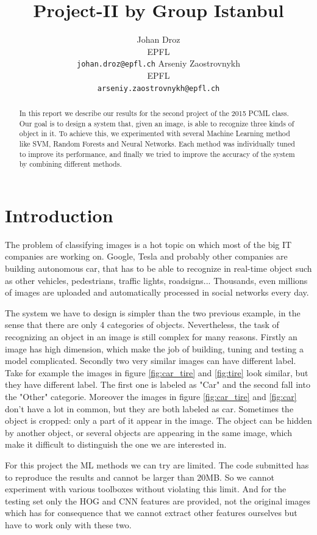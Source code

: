 \documentclass{article} %
\title{Project-II by Group Istanbul}
\author{
Johan Droz\\
EPFL \\
\texttt{johan.droz@epfl.ch} \And
Arseniy Zaostrovnykh\\
EPFL \\
\texttt{arseniy.zaostrovnykh@epfl.ch}
}
\begin{document}
\maketitle

\begin{abstract}
In this report we describe our results for the second project of the 2015 PCML class.
Our goal is to design a system that, given an image, is able to recognize three kinds of object in it.
To achieve this, we experimented with several Machine Learning method like SVM, Random Forests and Neural Networks. Each method was individually tuned to improve its performance, and finally we tried to improve the accuracy of the system by combining different methods.

\end{abstract}

\section{Introduction}

The problem of classifying images is a hot topic on which most of the big IT companies are working on.
Google, Tesla and probably other companies are building autonomous car, that has to be able to recognize in real-time object such as other vehicles, pedestrians, traffic lights, roadsigns...
Thousands, even millions of images are uploaded and automatically processed in social networks every day.

The system we have to design is simpler than the two previous example, in the sense that there are only 4 categories of objects. Nevertheless, the task of recognizing an object in an image is still complex for many reasons.
Firstly an image has high dimension, which make the job of building, tuning and testing a model complicated.
Secondly two very similar images can have different label.
Take for example the images in figure \ref{fig:car_tire} and \ref{fig:tire} look similar, but they have different label. The first one is labeled as "Car" and the second fall into the "Other" categorie. Moreover the images in figure \ref{fig:car_tire} and \ref{fig:car} don't have a lot in common, but they are both labeled as car.
Sometimes the object is cropped: only a part of it appear in the image. The object can be hidden by another object, or several objects are appearing in the same image, which make it difficult to distinguish the one we are interested in.

For this project the ML methods we can try are limited. The code submitted has to reproduce the results and cannot be larger than 20MB. So we cannot experiment with various toolboxes without violating this limit.
And for the testing set only the HOG and CNN features are provided, not the original images which has for consequence that we cannot extract other features ourselves but have to work only with these two.
\end{document}
